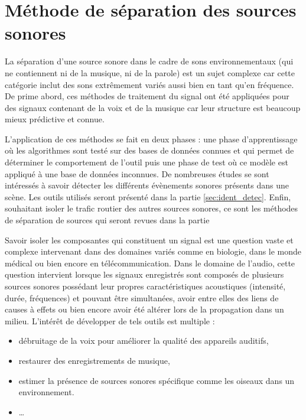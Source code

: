 %
%
%
%
%

\chapter{Méthode de séparation des sources sonores}

La séparation d'une source sonore dans le cadre de sons environnementaux (qui ne contiennent ni de la musique, ni de la parole) est un sujet complexe car cette catégorie inclut des sons extrêmement variés aussi bien en tant qu'en fréquence. De prime abord, ces méthodes de traitement du signal ont été appliquées pour des signaux contenant de la voix et de la musique car leur structure est beaucoup mieux prédictive et connue. 


L'application de ces méthodes se fait en deux phases : une phase d'apprentissage où les algorithmes sont testé sur des bases de données connues et qui permet de déterminer le comportement de l'outil puis une phase de test où ce modèle est appliqué à une base de données inconnues. De nombreuses études se sont intéressés à savoir détecter les différents évènements sonores présents dans une scène. Les outils utilisés seront présenté dans la partie \ref{sec:ident_detec}. Enfin, souhaitant isoler le trafic routier des autres sources sonores, ce sont les méthodes de séparation de sources qui seront revues dans la partie

Savoir isoler les composantes qui constituent un signal est une question vaste et complexe intervenant dans des domaines variés comme  en biologie, dans le monde médical ou bien encore en télécommunication. Dans le domaine de l'audio, cette question intervient lorsque les signaux enregistrés sont composés de plusieurs sources sonores possédant leur propres caractéristiques acoustiques (intensité, durée, fréquences) et pouvant être simultanées, avoir entre elles des liens de causes à effets ou bien encore avoir été altérer lors de la propagation dans un milieu. L'intérêt de développer de tels outils est multiple : 

\begin{itemize}
\item débruitage de la voix pour améliorer la qualité des appareils auditifs,
\item restaurer des enregistrements de musique,
\item estimer la présence de sources sonores spécifique comme les oiseaux dans un environnement.
\item \dots
\end{itemize}

